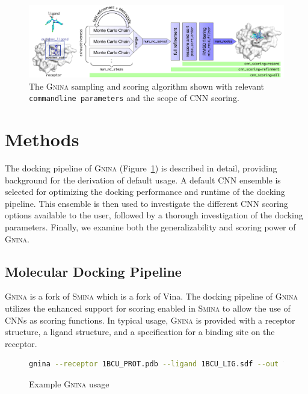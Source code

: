 \documentclass[linenumbers,doublespacing]{bmcart}
\begin{document}
\begin{figure}[tb]
    \centering
    \includegraphics[width=\linewidth]{figures/gnina}
    \caption{The \textsc{Gnina} sampling and scoring algorithm shown with relevant \texttt{commandline parameters} and the scope of CNN scoring.}
    \label{fig:workflow}
\end{figure}

\section{Methods}

The docking pipeline of \textsc{Gnina} (Figure~\ref{fig:workflow}) is described in detail, providing background for the derivation of default usage. A default CNN ensemble is selected for optimizing the docking performance and runtime of the docking pipeline. This ensemble is then used to investigate the different CNN scoring options available to the user, followed by a thorough investigation of the docking parameters. Finally, we examine both the generalizability and scoring power of \textsc{Gnina}.


\subsection{Molecular Docking Pipeline}
\textsc{\textsc{Gnina}} is a fork of \textsc{Smina}\cite{koes2013lessons} which is a fork of Vina\cite{trott2010autodock}. The docking pipeline of \textsc{\textsc{Gnina}} utilizes the enhanced support for scoring enabled in \textsc{Smina} to allow the use of CNNs as scoring functions. In typical usage, \textsc{\textsc{Gnina}} is provided with a receptor structure, a ligand structure, and a specification for a binding site on the receptor.

\begin{figure}[tb]
    \begin{lstlisting}[frame=none,label=code:Usage,language=bash,basicstyle=\tt]
gnina --receptor 1BCU_PROT.pdb --ligand 1BCU_LIG.sdf --out 1BCU_gnina_poses.sdf.gz --autobox_ligand 1BCU_LIG.sdf --autobox_add 4 --cnn crossdock_default2018 dense_3 --cnn_scoring rescore --exhaustiveness 8 --num_mc_saved 50 --cnn_rotation 0 --num_modes 9 --min_rmsd_filter 1
    \end{lstlisting}
\caption{Example \textsc{Gnina} usage}
\end{figure}
\end{document}
